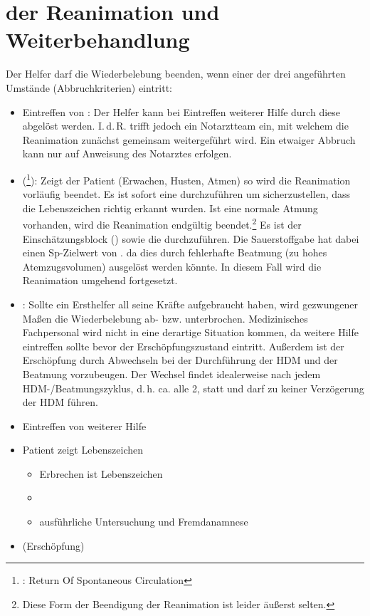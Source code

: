 \section{ der Reanimation und Weiterbehandlung}

{
Der Helfer darf die Wiederbelebung beenden, wenn einer der
drei angeführten Umstände (Abbruchkriterien) eintritt:

\begin{itemize}
  \item Eintreffen von : Der Helfer
  kann bei Eintreffen weiterer Hilfe durch diese abgelöst
  werden. I.\,d.\,R. trifft jedoch ein Notarztteam ein, mit
  welchem die Reanimation zunächst gemeinsam weitergeführt
  wird. Ein etwaiger Abbruch kann nur auf Anweisung des Notarztes
  erfolgen.
  \item {} 
  (\footnote{: Return Of Spontaneous Circulation}):  
  Zeigt der Patient  (Erwachen,
  Husten, Atmen) so wird die Reanimation vorläufig beendet. 
  Es ist sofort eine 
  durchzuführen um sicherzustellen, dass die
  Lebenszeichen richtig erkannt wurden. 
  Ist eine normale Atmung vorhanden,
  wird die Reanimation endgültig beendet.\footnote{Diese Form der Beendigung der Reanimation
  ist leider äußerst selten.} Es ist der Einschätzungsblock 
  () sowie die
  {\TxMassVit} durchzuführen. Die Sauerstoffgabe hat dabei
  einen Sp-Zielwert von \PC*.
   da dies
  durch fehlerhafte Beatmung (zu hohes Atemzugsvolumen)
  ausgelöst werden könnte. In diesem Fall wird die
  Reanimation umgehend fortgesetzt.
  \item {}: Sollte ein Ersthelfer all seine Kräfte
  aufgebraucht haben, wird gezwungener Maßen die
  Wiederbelebung ab- bzw.
  unterbrochen. Medizinisches Fachpersonal wird nicht in
  eine derartige Situation kommen, da weitere Hilfe
  eintreffen sollte bevor der Erschöpfungszustand eintritt.
  Außerdem ist der Erschöpfung durch Abwechseln bei der
  Durchführung der HDM und der Beatmung vorzubeugen. Der
  Wechsel findet idealerweise nach jedem
  HDM-/Beatmungszyklus, d.\,h. ca.
  alle 2\Min*, statt und darf zu keiner Verzögerung der HDM
  führen.
\end{itemize}

}{
\begin{itemize}
  \item Eintreffen von weiterer Hilfe
  \item Patient zeigt Lebenszeichen
  \begin{itemize}
    \item Erbrechen ist  Lebenszeichen
    \item {\TxMassVit}
    \item ausführliche Untersuchung und Fremdanamnese
    \end{itemize}
  \item (Erschöpfung)
\end{itemize}
}



